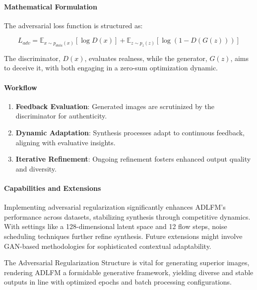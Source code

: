 \paragraph{Mathematical Formulation}
The adversarial loss function is structured as:

\begin{equation}
L_{adv} = \mathbb{E}_{x \sim p_{data}(x)} [\log D(x)] + \mathbb{E}_{z \sim p_{z}(z)} [\log(1 - D(G(z)))]
\end{equation}

The discriminator, \( D(x) \), evaluates realness, while the generator, \( G(z) \), aims to deceive it, with both engaging in a zero-sum optimization dynamic.

\paragraph{Workflow}
\begin{enumerate}
    \item \textbf{Feedback Evaluation}: Generated images are scrutinized by the discriminator for authenticity.
    \item \textbf{Dynamic Adaptation}: Synthesis processes adapt to continuous feedback, aligning with evaluative insights.
    \item \textbf{Iterative Refinement}: Ongoing refinement fosters enhanced output quality and diversity.
\end{enumerate}

\paragraph{Capabilities and Extensions}
Implementing adversarial regularization significantly enhances ADLFM's performance across datasets, stabilizing synthesis through competitive dynamics. With settings like a 128-dimensional latent space and 12 flow steps, noise scheduling techniques further refine synthesis. Future extensions might involve GAN-based methodologies for sophisticated contextual adaptability.

The Adversarial Regularization Structure is vital for generating superior images, rendering ADLFM a formidable generative framework, yielding diverse and stable outputs in line with optimized epochs and batch processing configurations.
